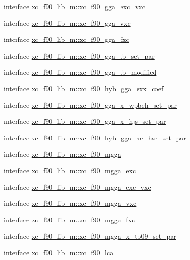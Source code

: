 \begin{DoxyCompactItemize}
\item 
interface \hyperlink{interfacexc__f90__lib__m_1_1xc__f90__gga__exc__vxc}{xc\-\_\-f90\-\_\-lib\-\_\-m\-::xc\-\_\-f90\-\_\-gga\-\_\-exc\-\_\-vxc}
\item 
interface \hyperlink{interfacexc__f90__lib__m_1_1xc__f90__gga__vxc}{xc\-\_\-f90\-\_\-lib\-\_\-m\-::xc\-\_\-f90\-\_\-gga\-\_\-vxc}
\item 
interface \hyperlink{interfacexc__f90__lib__m_1_1xc__f90__gga__fxc}{xc\-\_\-f90\-\_\-lib\-\_\-m\-::xc\-\_\-f90\-\_\-gga\-\_\-fxc}
\item 
interface \hyperlink{interfacexc__f90__lib__m_1_1xc__f90__gga__lb__set__par}{xc\-\_\-f90\-\_\-lib\-\_\-m\-::xc\-\_\-f90\-\_\-gga\-\_\-lb\-\_\-set\-\_\-par}
\item 
interface \hyperlink{interfacexc__f90__lib__m_1_1xc__f90__gga__lb__modified}{xc\-\_\-f90\-\_\-lib\-\_\-m\-::xc\-\_\-f90\-\_\-gga\-\_\-lb\-\_\-modified}
\item 
interface \hyperlink{interfacexc__f90__lib__m_1_1xc__f90__hyb__gga__exx__coef}{xc\-\_\-f90\-\_\-lib\-\_\-m\-::xc\-\_\-f90\-\_\-hyb\-\_\-gga\-\_\-exx\-\_\-coef}
\item 
interface \hyperlink{interfacexc__f90__lib__m_1_1xc__f90__gga__x__wpbeh__set__par}{xc\-\_\-f90\-\_\-lib\-\_\-m\-::xc\-\_\-f90\-\_\-gga\-\_\-x\-\_\-wpbeh\-\_\-set\-\_\-par}
\item 
interface \hyperlink{interfacexc__f90__lib__m_1_1xc__f90__gga__x__hjs__set__par}{xc\-\_\-f90\-\_\-lib\-\_\-m\-::xc\-\_\-f90\-\_\-gga\-\_\-x\-\_\-hjs\-\_\-set\-\_\-par}
\item 
interface \hyperlink{interfacexc__f90__lib__m_1_1xc__f90__hyb__gga__xc__hse__set__par}{xc\-\_\-f90\-\_\-lib\-\_\-m\-::xc\-\_\-f90\-\_\-hyb\-\_\-gga\-\_\-xc\-\_\-hse\-\_\-set\-\_\-par}
\item 
interface \hyperlink{interfacexc__f90__lib__m_1_1xc__f90__mgga}{xc\-\_\-f90\-\_\-lib\-\_\-m\-::xc\-\_\-f90\-\_\-mgga}
\item 
interface \hyperlink{interfacexc__f90__lib__m_1_1xc__f90__mgga__exc}{xc\-\_\-f90\-\_\-lib\-\_\-m\-::xc\-\_\-f90\-\_\-mgga\-\_\-exc}
\item 
interface \hyperlink{interfacexc__f90__lib__m_1_1xc__f90__mgga__exc__vxc}{xc\-\_\-f90\-\_\-lib\-\_\-m\-::xc\-\_\-f90\-\_\-mgga\-\_\-exc\-\_\-vxc}
\item 
interface \hyperlink{interfacexc__f90__lib__m_1_1xc__f90__mgga__vxc}{xc\-\_\-f90\-\_\-lib\-\_\-m\-::xc\-\_\-f90\-\_\-mgga\-\_\-vxc}
\item 
interface \hyperlink{interfacexc__f90__lib__m_1_1xc__f90__mgga__fxc}{xc\-\_\-f90\-\_\-lib\-\_\-m\-::xc\-\_\-f90\-\_\-mgga\-\_\-fxc}
\item 
interface \hyperlink{interfacexc__f90__lib__m_1_1xc__f90__mgga__x__tb09__set__par}{xc\-\_\-f90\-\_\-lib\-\_\-m\-::xc\-\_\-f90\-\_\-mgga\-\_\-x\-\_\-tb09\-\_\-set\-\_\-par}
\item 
interface \hyperlink{interfacexc__f90__lib__m_1_1xc__f90__lca}{xc\-\_\-f90\-\_\-lib\-\_\-m\-::xc\-\_\-f90\-\_\-lca}
\end{DoxyCompactItemize}
